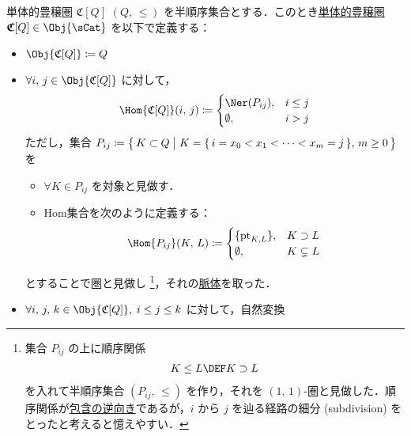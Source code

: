 \documentclass[TQFT_main]{subfiles}
\begin{document}
\begin{mydef}[label=def:PathCat,breakable]{単体的豊穣圏 {$\mathfrak{C}[Q]$}}
$(Q,\, \le)$ を半順序集合とする．このとき\hyperref[def:SimpCat]{単体的豊穣圏} $\bm{\mathfrak{C}}[Q] \in \Obj{\sCat}$ を以下で定義する：
\begin{itemize}
    \item $\Obj{\mathfrak{C}[Q]} \coloneqq Q$
    \item $\forall i,\, j \in \Obj{\mathfrak{C}[Q]}$ に対して，
    \begin{align}
        \Hom{\mathfrak{C}[Q]} (i,\, j) \coloneqq 
        \begin{cases}
            \Ner (P_{ij}), &i \le j \\
            \emptyset, &i > j
        \end{cases}
    \end{align}
    ただし，集合 $P_{ij} \coloneqq \bigl\{\, K \subset Q \bigm| K = \{\, i = x_0 < x_1 < \cdots < x_m = j \,\},\, m \ge 0 \,\bigr\}$ 
    を
    \begin{itemize}
        \item $\forall K \in P_{ij}$ を対象と見做す．
        \item Hom集合を次のように定義する：
        \begin{align}
            \Hom{P_{ij}} (K,\, L) \coloneqq 
            \begin{cases}
                \{\mathrm{pt}_{K,L}\}, &K \supset L \\
                \emptyset, &K \subsetneq L
            \end{cases}
        \end{align}
    \end{itemize}
    とすることで圏と見做し
    \footnote{
        集合 $P_{ij}$ の上に順序関係
        \begin{align}
            K \le L \DEF K \supset L
        \end{align}
        を入れて半順序集合 $(P_{ij},\, \le)$ を作り，それを $(1,\, 1)$-圏と見做した．順序関係が\underline{包含の逆向き}であるが，$i$ から $j$ を辿る経路の細分 (subdivision) をとったと考えると憶えやすい．
    }，それの\hyperref[def:nerve]{脈体}を取った．
    \item $\forall i,\, j,\, k \in \Obj{\mathfrak{C}[Q]},\; i \le j \le k$ に対して，自然変換

\end{itemize}
\end{mydef}
\end{document}
